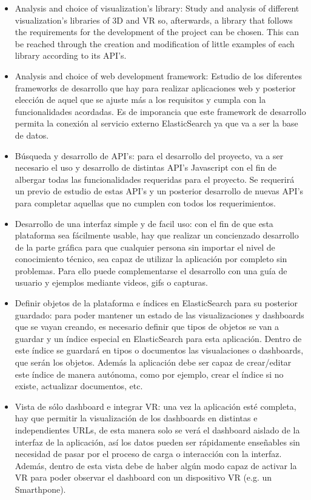 \documentclass[a4paper, 12pt]{book}
\begin{document}
\begin{itemize}
\item Analysis and choice of visualization’s library: Study and analysis of different visualization’s libraries of 3D and VR so, afterwards, a library that follows the requirements for the development of the project can be chosen. This can be reached through the creation and modification of little examples of each library according to its API's.
\item Analysis and choice of web development framework: Estudio de los diferentes frameworks de desarrollo que hay para realizar aplicaciones web y posterior elección de aquel que se ajuste más a los requisitos y cumpla con la funcionalidades acordadas. Es de imporancia que este framework de desarrollo permita la conexión al servicio externo ElasticSearch ya que va a ser la base de datos.
\item Búsqueda y desarrollo de API's: para el desarrollo del proyecto, va a ser necesario el uso y desarrollo de distintas API's Javascript con el fin de albergar todas las funcionalidades requeridas para el proyecto. Se requerirá un previo de estudio de estas API's y un posterior desarrollo de nuevas API's para completar aquellas que no cumplen con todos los requerimientos.
\item Desarrollo de una interfaz simple y de facil uso: con el fin de que esta plataforma sea fácilmente usable, hay que realizar un concienzado desarrollo de la parte gráfica para que cualquier persona sin importar el nivel de conocimiento técnico, sea capaz de utilizar la aplicación por completo sin problemas. Para ello puede complementarse el desarrollo con una guía de usuario y ejemplos mediante videos, gifs o capturas.
\item Definir objetos de la plataforma e índices en ElasticSearch para su posterior guardado: para poder mantener un estado de las visualizaciones y dashboards que se vayan creando, es necesario definir que tipos de objetos se van a guardar y un índice especial en ElasticSearch para esta aplicación. Dentro de este índice se guardará en tipos o documentos las visualaciones o dashboards, que serán los objetos. Además la aplicación debe ser capaz de crear/editar este índice de manera autónoma, como por ejemplo, crear el índice si no existe, actualizar documentos, etc.
\item Vista de sólo dashboard e integrar VR: una vez la aplicación esté completa, hay que permitir la visualización de los dashboards en distintas e independientes URLs, de esta manera solo se verá el dashboard aislado de la interfaz de la aplicación, así los datos pueden ser rápidamente enseñables sin necesidad de pasar por el proceso de carga o interacción con la interfaz. Además, dentro de esta vista debe de haber algún modo capaz de activar la VR para poder observar el dashboard con un dispositivo VR (e.g. un Smarthpone).

\end{itemize}
\end{document}
